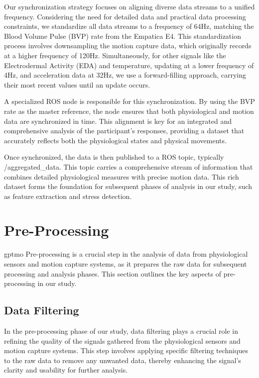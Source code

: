 Our synchronization strategy focuses on aligning diverse data streams to a unified frequency. Considering the need for detailed data and practical data processing constraints, we standardize all data streams to a frequency of 64Hz, matching the Blood Volume Pulse (BVP) rate from the Empatica E4. This standardization process involves downsampling the motion capture data, which originally records at a higher frequency of 120Hz. Simultaneously, for other signals like the Electrodermal Activity (EDA) and temperature, updating at a lower frequency of 4Hz, and acceleration data at 32Hz, we use a forward-filling approach, carrying their most recent values until an update occurs.

A specialized ROS node is responsible for this synchronization.  By using the BVP rate as the master reference, the node ensures that both physiological and motion data are synchronized in time. This alignment is key for an integrated and comprehensive analysis of the participant's responses, providing a dataset that accurately reflects both the physiological states and physical movements.

Once synchronized, the data is then published to a ROS topic, typically /aggregated\_data. This topic carries a comprehensive stream of information that combines detailed physiological measures with precise motion data. This rich dataset forms the foundation for subsequent phases of analysis in our study, such as feature extraction and stress detection.

\section{Pre-Processing} \gls*{gptmo}
Pre-processing is a crucial step in the analysis of data from physiological sensors and motion capture systems, as it prepares the raw data for subsequent processing and analysis phases. This section outlines the key aspects of pre-processing in our study.

\subsection*{Data Filtering} \label{sec:data_filtering}

In the pre-processing phase of our study, data filtering plays a crucial role in refining the quality of the signals gathered from the physiological sensors and motion capture systems. This step involves applying specific filtering techniques to the raw data to remove any unwanted data, thereby enhancing the signal's clarity and usability for further analysis.

